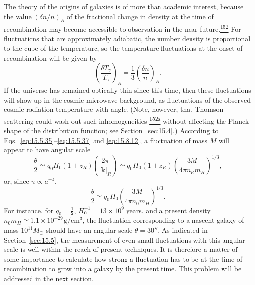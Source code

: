 The theory of the origins of galaxies is of more than academic interest,
because the value \((\delta n/n)_R\) of the fractional change in density at
the time of recombination may become accessible to observation in the near
future.\hyperref[ch15-ref-152]{\textsuperscript{152}} For fluctuations that
are approximately adiabatic, the number density is proportional to the cube
of the temperature, so the temperature fluctuations at the onset of
recombination will be given by
\begin{equation}
  \left(\frac{\delta T_\gamma}{T_\gamma}\right)_R
  =
  \frac13\left(\frac{\delta n}{n}\right)_R.
  \tag{15.8.35}\label{eq:15.8.35}
\end{equation}
If the universe has remained optically thin since this time, then these
fluctuations will show up in the cosmic microwave background, as fluctuations
of the observed cosmic radiation temperature with angle. (Note, however,
that Thomson scattering could wash out such inhomogeneities%
\hyperref[ch15-ref-152a]{\textsuperscript{152a}} without affecting the Planck
shape of the distribution function; see Section~\ref{sec:15.4}.) According
to Eqs.~\eqref{eq:15.5.35}--\eqref{eq:15.5.37} and \eqref{eq:15.8.12}, a
fluctuation of mass \(M\) will appear to have angular scale
\[
  \frac{\theta}{2}
  \simeq
  q_0H_0(1+z_R)
  \left(
    \frac{2\pi}{\lvert\mathbf k\rvert_R}
  \right)
  \simeq
  q_0H_0(1+z_R)
  \left(
    \frac{3M}{4\pi n_Rm_H}
  \right)^{1/3},
\]
or, since \(n\propto a^{-3}\),
\begin{equation}
  \frac{\theta}{2}
  \simeq
  q_0H_0
  \left(
    \frac{3M}{4\pi n_0m_H}
  \right)^{1/3}.
  \tag{15.8.36}\label{eq:15.8.36}
\end{equation}
For instance, for \(q_0=\tfrac12\),
\(H_0^{-1}=13\times10^9\) years, and a present density
\(n_0m_H\simeq1.1\times10^{-29}\,\mathrm{g/cm^3}\), the fluctuation
corresponding to a nascent galaxy of mass \(10^{11}M_\odot\) should have an
angular scale \(\theta=30''\). As indicated in Section~\ref{sec:15.5}, the
measurement of even small fluctuations with this angular scale is well within
the reach of present techniques. It is therefore a matter of some importance
to calculate how strong a fluctuation has to be at the time of recombination
to grow into a galaxy by the present time. This problem will be addressed in
the next section.
